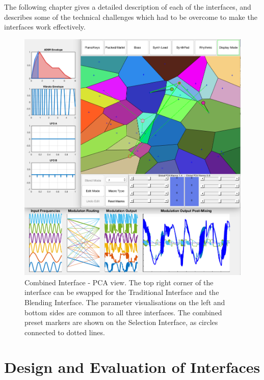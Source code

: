 \documentclass[11pt, oneside]{report}   	%
\begin{document}
The following chapter gives a detailed description of each of the interfaces, and describes some of the technical challenges which had to be overcome to make the interfaces work effectively.
\begin{figure}[h] 
	\centering
	\hspace*{-1.5cm}
	\includegraphics[width = 7.5in]{CombinedInterface1.png}
	\caption{Combined Interface - PCA view. The top right corner of the interface can be swapped for the Traditional Interface and the Blending Interface. The parameter visualisations on the left and bottom sides are common to all three interfaces. The combined preset markers are shown on the Selection Interface, as circles connected to dotted lines.}
	\label{fig:CombinedInterface}
\end{figure}

\chapter{Design and Evaluation of Interfaces}
\end{document}
